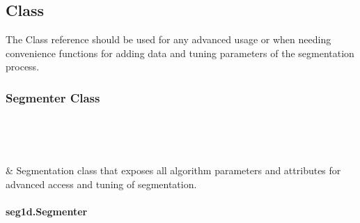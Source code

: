 \documentclass[letterpaper,10pt,english]{sphinxmanual}
\begin{document}
\subsection{Class}
\label{\detokenize{code:class}}
\sphinxAtStartPar
The Class reference should be used for any advanced usage or when needing
convenience functions for adding data and tuning parameters of the segmentation process.


\subsubsection{Segmenter Class}
\label{\detokenize{segmenter:segmenter-class}}\label{\detokenize{segmenter::doc}}

\begin{savenotes}\sphinxatlongtablestart\begin{longtable}[c]{}
\hline

\endfirsthead

%
{}\\
\hline

\endhead

\hline
{}\\
\endfoot

\endlastfoot

\sphinxAtStartPar
{\hyperref[\detokenize{generated/seg1d.Segmenter:seg1d.Segmenter}]{}}
&
\sphinxAtStartPar
Segmentation class that exposes all algorithm parameters and attributes for advanced access and tuning of segmentation.
\\
\hline
\end{longtable}\sphinxatlongtableend\end{savenotes}


\paragraph{seg1d.Segmenter}
\label{\detokenize{generated/seg1d.Segmenter:seg1d-segmenter}}\label{\detokenize{generated/seg1d.Segmenter::doc}}
\end{document}
